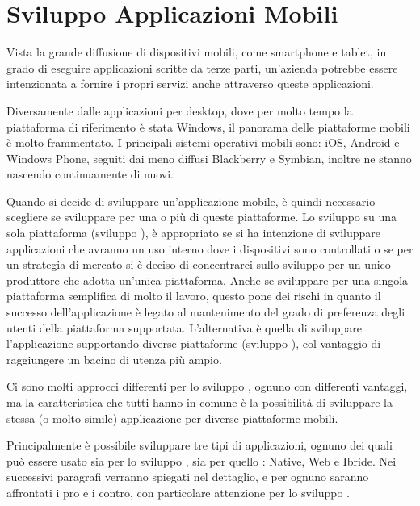 \chapter{Sviluppo Applicazioni Mobili}
	Vista la grande diffusione di dispositivi mobili, come smartphone e tablet, 
	in grado di eseguire applicazioni scritte da terze parti, un'azienda 
	potrebbe essere intenzionata a fornire i propri servizi anche attraverso 
	queste applicazioni.
	
	Diversamente dalle applicazioni per desktop, dove per molto tempo la 
	piattaforma di riferimento è stata Windows, il panorama delle piattaforme 
	mobili è molto frammentato. I principali sistemi operativi mobili sono: iOS, 
	Android e Windows Phone, seguiti dai meno diffusi Blackberry e Symbian, 
	inoltre ne stanno nascendo continuamente di nuovi.
	
	Quando si decide di sviluppare un'applicazione mobile, è quindi necessario 
	scegliere se sviluppare per una o più di queste piattaforme. Lo sviluppo su 
	una sola piattaforma (sviluppo \singleplat), è appropriato se si ha 
	intenzione di sviluppare applicazioni che avranno un uso interno dove i 
	dispositivi sono controllati o se per un strategia di mercato si è deciso di 
	concentrarci sullo sviluppo per un unico produttore che adotta un'unica 
	piattaforma. Anche se sviluppare per una singola piattaforma semplifica di 
	molto il lavoro, questo pone dei rischi in quanto il successo 
	dell'applicazione è legato al mantenimento del grado di preferenza degli 
	utenti della piattaforma supportata. L'alternativa è quella di sviluppare 
	l'applicazione supportando diverse piattaforme (sviluppo \crossplat), 
	col vantaggio di raggiungere un bacino di utenza più ampio.
	
	Ci sono molti approcci differenti per lo sviluppo \crossplat, ognuno con 
	differenti vantaggi, ma la caratteristica che tutti hanno in comune è la 
	possibilità di sviluppare la stessa (o molto simile) applicazione per 
	diverse piattaforme mobili.
	 
	Principalmente è possibile sviluppare tre tipi di applicazioni, ognuno dei 
	quali può essere usato sia per lo sviluppo \singleplat, sia per quello 
	\crossplat: Native, Web e Ibride. Nei successivi paragrafi 
	verranno spiegati nel dettaglio, e per ognuno saranno affrontati i pro e i 
	contro, con particolare attenzione per lo sviluppo \crossplat.
	
